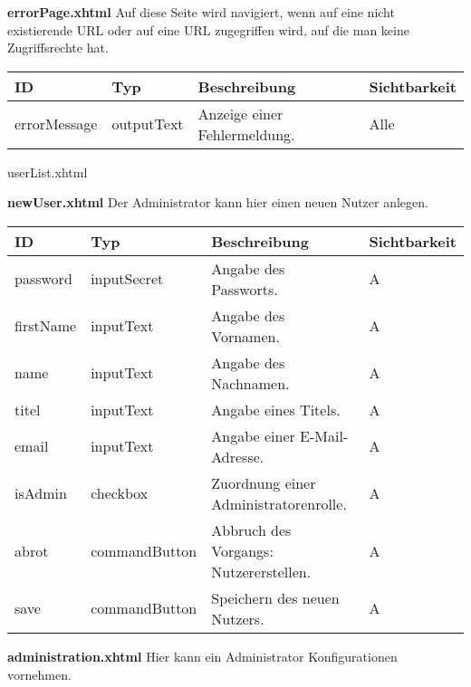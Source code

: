
\textbf{errorPage.xhtml} Auf diese Seite wird navigiert, wenn auf eine nicht existierende URL oder auf eine URL zugegriffen wird, auf die man keine Zugriffsrechte hat.

\begin{tabular}[H]{|m{2cm}|m{3cm}|m{6cm}|m{2.5cm}|}
    \hline
    \textbf{ID} & \textbf{Typ} & \textbf{Beschreibung} & \textbf{Sichtbarkeit} \\
    \hline
    \hline
    errorMessage & outputText & Anzeige einer Fehlermeldung. & Alle\\
    \hline
\end{tabular}

userList.xhtml

\textbf{newUser.xhtml} Der Administrator kann hier einen neuen Nutzer anlegen.

\begin{tabular}[H]{|m{2cm}|m{3cm}|m{6cm}|m{2.5cm}|}
    \hline
    \textbf{ID} & \textbf{Typ} & \textbf{Beschreibung} & \textbf{Sichtbarkeit} \\
    \hline
    \hline
    password & inputSecret & Angabe des Passworts. & A\\
    \hline
    firstName & inputText & Angabe des Vornamen. & A\\
    \hline
    name & inputText & Angabe des Nachnamen. & A\\
    \hline
    titel & inputText & Angabe eines Titels. & A\\
    \hline
    email & inputText & Angabe einer E-Mail-Adresse. & A\\
    \hline
    isAdmin & checkbox & Zuordnung einer Administratorenrolle. & A\\
    \hline
    abrot & commandButton & Abbruch des Vorgangs: Nutzererstellen. & A\\
    \hline
    save & commandButton & Speichern des neuen Nutzers. & A \\
    \hline
\end{tabular}

\textbf{administration.xhtml} Hier kann ein Administrator Konfigurationen vornehmen.

